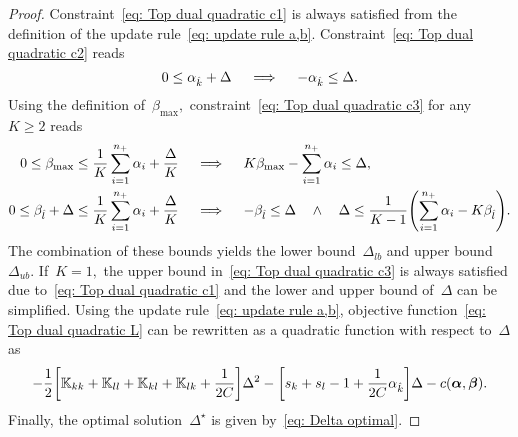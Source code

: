 \begin{proof}
  Constraint~\eqref{eq: Top dual quadratic c1} is always satisfied from the definition of the update rule~\eqref{eq: update rule a,b}. Constraint~\eqref{eq: Top dual quadratic c2} reads
  \begin{equation*}
    0 \leq \alpha_{\hat{k}} + \Delta
    \quad \implies \quad
    - \alpha_{\hat{k}} \leq \Delta.
  \end{equation*}
  Using the definition of~$\beta_{\max},$ constraint~\eqref{eq: Top dual quadratic c3} for any~$K \geq 2$ reads
  \begin{align*}
    0 \leq \beta_{\max} \leq \frac{1}{K} \sum_{i = 1}^{\npos} \alpha_i + \frac{\Delta}{K} 
    & \quad \implies \quad
    K\beta_{\max} - \sum_{i = 1}^{\npos} \alpha_i \leq \Delta, \\
    0 \leq \betal + \Delta \leq \frac{1}{K} \sum_{i = 1}^{\npos} \alpha_i + \frac{\Delta}{K}
    & \quad \implies \quad
    -\betal \leq \Delta \quad \land \quad \Delta \leq \frac{1}{K-1}\Brac{\sum_{i = 1}^{\npos} \alpha_i - K \betal}.
  \end{align*}
  The combination of these bounds yields the lower bound~$\Delta_{lb}$ and upper bound~$\Delta_{ub}.$ If~$K = 1,$ the upper bound in~\eqref{eq: Top dual quadratic c3} is always satisfied due to~\eqref{eq: Top dual quadratic c1} and the lower and upper bound of~$\Delta$ can be simplified. Using the update rule~\eqref{eq: update rule a,b}, objective function~\eqref{eq: Top dual quadratic L} can be rewritten as a quadratic function with respect to~$\Delta$ as
  \begin{equation*}
    - \frac{1}{2} \Brac[s]{\K_{kk} + \K_{ll} + \K_{kl} + \K_{lk} + \frac{1}{2C}} \Delta^2
    - \Brac[s]{s_k + s_l - 1 + \frac{1}{2C} \alphak} \Delta
    - c(\bm{\alpha}, \bm{\beta}).
  \end{equation*}
  Finally, the optimal solution~$\Delta^{\star}$ is given by~\eqref{eq: Delta optimal}.
\end{proof}

